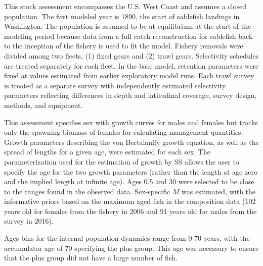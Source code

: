 \documentclass[11pt,
  english,
  a4paper,
]{article}
\begin{document}
\leavevmode\tagmcend\tagstructend\par


This stock assessment encompasses the U.S. West Coast and assumes a closed population. The first modeled year is 1890, the start of sablefish landings in Washington. The population is assumed to be at equilibrium at the start of the modeling period because data from a full catch reconstruction for sablefish back to the inception of the fishery is used to fit the model. Fishery removals were divided among two fleets, (1) fixed gears and (2) trawl gears. Selectivity schedules are treated separately for each fleet. In the base model, retention parameters were fixed at values estimated from earlier exploratory model runs. Each trawl survey is treated as a separate survey with independently estimated selectivity parameters reflecting differences in depth and latitudinal coverage, survey design, methods, and equipment.

\leavevmode\tagmcend\tagstructend\par


This assessment specifies sex with growth curves for males and females but tracks only the spawning biomass of females for calculating management quantities. Growth parameters describing the von Bertalanffy growth equation, as well as the spread of lengths for a given age, were estimated for each sex. The parameterization used for the estimation of growth by SS allows the user to specify the age for the two growth parameters (rather than the length at age zero and the implied length at infinite age). Ages 0.5 and 30 were selected to be close to the ranges found in the observed data. Sex-specific {\(M\)\leavevmode\tagmcend\tagstructend} was estimated, with the informative priors based on the maximum aged fish in the composition data (102 years old for females from the fishery in 2006 and 91 years old for males from the survey in 2016).

\leavevmode\tagmcend\tagstructend\par


Ages bins for the internal population dynamics range from 0-70 years, with the accumulator age of 70 specifying the plus group. This age was necessary to ensure that the plus group did not have a large number of fish.
\end{document}
